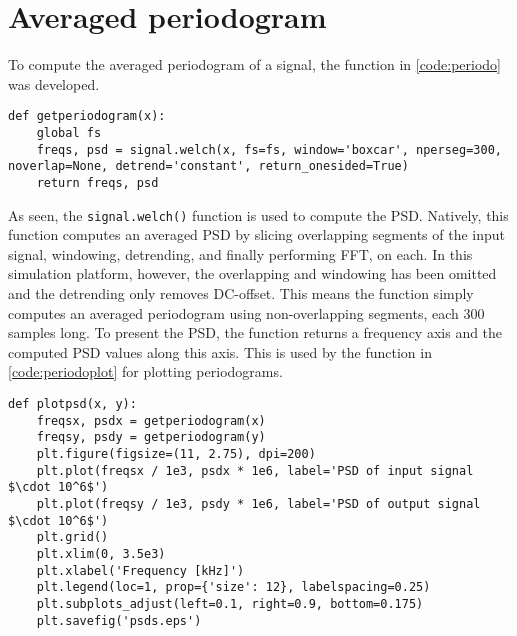 

\section{Averaged periodogram}
To compute the averaged periodogram of a signal, the function in \cref{code:periodo} was developed.

\lstset{language=python,caption=Function for computing averaged periodogram,label=code:periodo}
\begin{lstlisting}
def getperiodogram(x):
    global fs
    freqs, psd = signal.welch(x, fs=fs, window='boxcar', nperseg=300, noverlap=None, detrend='constant', return_onesided=True)
    return freqs, psd
\end{lstlisting}

As seen, the \texttt{signal.welch()} function is used to compute the PSD. Natively, this function computes an averaged PSD by slicing overlapping segments of the input signal, windowing, detrending, and finally performing FFT, on each. In this simulation platform, however, the overlapping and windowing has been omitted and the detrending only removes DC-offset. This means the function simply computes an averaged periodogram using non-overlapping segments, each 300 samples long. To present the PSD, the function returns a frequency axis and the computed PSD values along this axis. This is used by the function in \cref{code:periodoplot} for plotting periodograms.

\lstset{language=python,caption=Function for plotting periodogram of in- and output signals,label=code:periodoplot}
\begin{lstlisting}
def plotpsd(x, y):
    freqsx, psdx = getperiodogram(x)
    freqsy, psdy = getperiodogram(y)
    plt.figure(figsize=(11, 2.75), dpi=200)
    plt.plot(freqsx / 1e3, psdx * 1e6, label='PSD of input signal $\cdot 10^6$')
    plt.plot(freqsy / 1e3, psdy * 1e6, label='PSD of output signal $\cdot 10^6$')
    plt.grid()
    plt.xlim(0, 3.5e3)
    plt.xlabel('Frequency [kHz]')
    plt.legend(loc=1, prop={'size': 12}, labelspacing=0.25)
    plt.subplots_adjust(left=0.1, right=0.9, bottom=0.175)
    plt.savefig('psds.eps')
\end{lstlisting}

